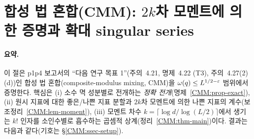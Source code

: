 \section{합성 법 혼합(CMM): $2k$차 모멘트에 의한 증명과 확대 singular series}\label{CMM:sec}

\paragraph{요약.}
이 절은 p1p4 보고서의 ``다음 연구 목표 1''(주의~4.21, 명제~4.22 (T3), 주의~4.27(2)(d))인
합성 법 혼합(composite-modulus mixing, CMM)을 $\omega(q)\le L^{1/2-\varepsilon}$ 범위에서 증명한다.
핵심은 (i) 소수 멱 성분별로 전개하는 \emph{정확 전개}(명제~\ref{CMM:prop-exact}),
(ii) 원시 지표에 대한 좋은/나쁜 지표 분할과 $2k$차 모멘트에 의한 나쁜 지표의 계수(보조정리~\ref{CMM:lem-moment}),
(iii) 모멘트 차수 $k=\lceil \log d/\log(L/2)\rceil$에서 생기는 $k!$ 인자를 소인수별로 흡수하는 곱셈적 상계(정리~\ref{CMM:thm-main})이다.
결과는 다음과 같다(기호는 \S\ref{CMM:ssec-setup}).
